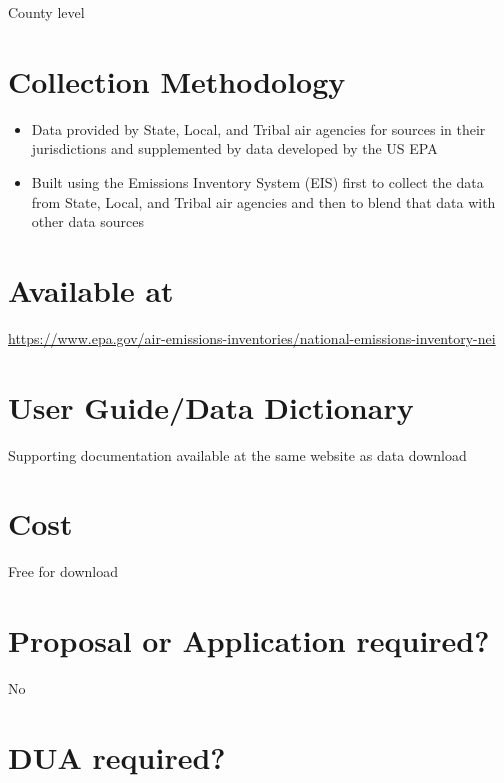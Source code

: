 \documentclass[
]{book}
\providecommand{\tightlist}{%
  \setlength{\itemsep}{0pt}\setlength{\parskip}{0pt}}
\begin{document}
County level

\hypertarget{collection-methodology-47}{%
\section{Collection Methodology}\label{collection-methodology-47}}

\begin{itemize}
\tightlist
\item
  Data provided by State, Local, and Tribal air agencies for sources in their jurisdictions and supplemented by data developed by the US EPA
\item
  Built using the Emissions Inventory System (EIS) first to collect the data from State, Local, and Tribal air agencies and then to blend that data with other data sources
\end{itemize}

\hypertarget{available-at-47}{%
\section{Available at}\label{available-at-47}}

\url{https://www.epa.gov/air-emissions-inventories/national-emissions-inventory-nei}

\hypertarget{user-guidedata-dictionary-47}{%
\section{User Guide/Data Dictionary}\label{user-guidedata-dictionary-47}}

Supporting documentation available at the same website as data download

\hypertarget{cost-47}{%
\section{Cost}\label{cost-47}}

Free for download

\hypertarget{proposal-or-application-required-47}{%
\section{Proposal or Application required?}\label{proposal-or-application-required-47}}

No

\hypertarget{dua-required-47}{%
\section{DUA required?}\label{dua-required-47}}
\end{document}
